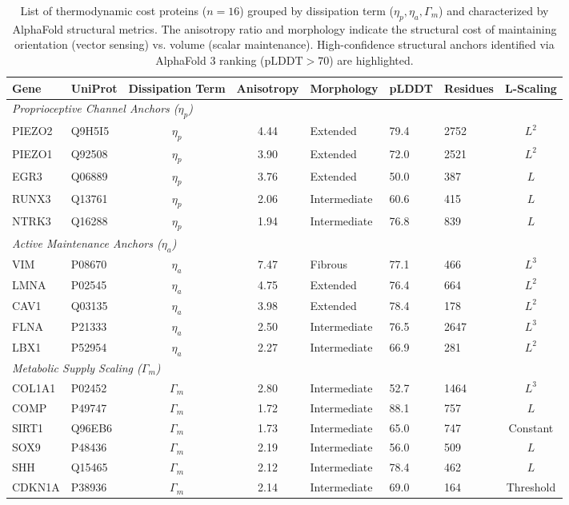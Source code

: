 \documentclass[11pt,a4paper]{article}
\begin{document}
\begin{table}[h!]
\centering
\caption{List of thermodynamic cost proteins ($n=16$) grouped by dissipation term ($\eta_p, \eta_a, \Gamma_m$) and characterized by AlphaFold structural metrics. The anisotropy ratio and morphology indicate the structural cost of maintaining orientation (vector sensing) vs. volume (scalar maintenance). High-confidence structural anchors identified via AlphaFold 3 ranking ($\text{pLDDT} > 70$) are highlighted.}
\label{tab:thermodynamic_cost_proteins}
\scriptsize
\begin{tabular}{llcclllc}
\toprule
\textbf{Gene} & \textbf{UniProt} & \textbf{Dissipation Term} & \textbf{Anisotropy} & \textbf{Morphology} & \textbf{pLDDT} & \textbf{Residues} & \textbf{L-Scaling} \\
\midrule
\multicolumn{8}{l}{\textit{Proprioceptive Channel Anchors ($\eta_p$)}} \\
PIEZO2 & Q9H5I5 & $\eta_{p}$ & 4.44 & Extended & 79.4 & 2752 & $L^2$ \\
PIEZO1 & Q92508 & $\eta_{p}$ & 3.90 & Extended & 72.0 & 2521 & $L^2$ \\
EGR3 & Q06889 & $\eta_{p}$ & 3.76 & Extended & 50.0 & 387 & $L$ \\
RUNX3 & Q13761 & $\eta_{p}$ & 2.06 & Intermediate & 60.6 & 415 & $L$ \\
NTRK3 & Q16288 & $\eta_{p}$ & 1.94 & Intermediate & 76.8 & 839 & $L$ \\
\midrule
\multicolumn{8}{l}{\textit{Active Maintenance Anchors ($\eta_a$)}} \\
VIM & P08670 & $\eta_{a}$ & 7.47 & Fibrous & 77.1 & 466 & $L^3$ \\
LMNA & P02545 & $\eta_{a}$ & 4.75 & Extended & 76.4 & 664 & $L^2$ \\
CAV1 & Q03135 & $\eta_{a}$ & 3.98 & Extended & 78.4 & 178 & $L^2$ \\
FLNA & P21333 & $\eta_{a}$ & 2.50 & Intermediate & 76.5 & 2647 & $L^3$ \\
LBX1 & P52954 & $\eta_{a}$ & 2.27 & Intermediate & 66.9 & 281 & $L^2$ \\
\midrule
\multicolumn{8}{l}{\textit{Metabolic Supply Scaling ($\Gamma_m$)}} \\
COL1A1 & P02452 & $\Gamma_{m}$ & 2.80 & Intermediate & 52.7 & 1464 & $L^3$ \\
COMP & P49747 & $\Gamma_{m}$ & 1.72 & Intermediate & 88.1 & 757 & $L$ \\
SIRT1 & Q96EB6 & $\Gamma_{m}$ & 1.73 & Intermediate & 65.0 & 747 & Constant \\
SOX9 & P48436 & $\Gamma_{m}$ & 2.19 & Intermediate & 56.0 & 509 & $L$ \\
SHH & Q15465 & $\Gamma_{m}$ & 2.12 & Intermediate & 78.4 & 462 & $L$ \\
CDKN1A & P38936 & $\Gamma_{m}$ & 2.14 & Intermediate & 69.0 & 164 & Threshold \\
\bottomrule
\end{tabular}
\end{table}
\end{document}
